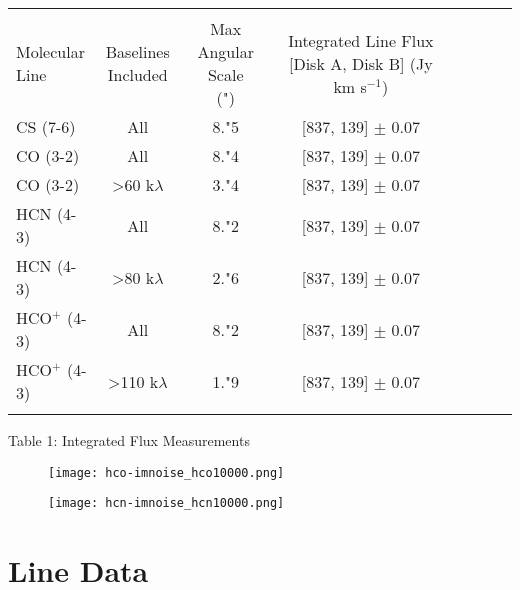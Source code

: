 \begin{tabular}{l*{6}{c}r}
  \hline\hline \\

  \shortstack{Molecular \\ Line} & \shortstack{Baselines \\ Included} & \shortstack{Max Angular Scale \\ (")} & \shortstack{Integrated Line Flux [Disk A, Disk B]\\ (Jy km s$^{-1}$)} \\
  \hline
  CS (7-6)         & All                            & 8."5 & [837, 139] $\pm$ 0.07 \\
  CO (3-2)         & All                            & 8."4 & [837, 139] $\pm$ 0.07 \\
  CO (3-2)         & \textgreater 60 k$\lambda$     & 3."4 & [837, 139] $\pm$ 0.07 \\
  HCN (4-3)        & All                            & 8."2 & [837, 139] $\pm$ 0.07 \\
  HCN (4-3)        & \textgreater 80 k$\lambda$     & 2."6 & [837, 139] $\pm$ 0.07 \\
  HCO$^{+}$ (4-3)  & All                            & 8."2 & [837, 139] $\pm$ 0.07 \\
  HCO$^{+}$ (4-3)  & \textgreater 110 k$\lambda$    & 1."9 & [837, 139] $\pm$ 0.07 \\
  \hline
  \label{baseline_cutting_table}
\end{tabular}
\caption{Table 1: Integrated Flux Measurements}
\bigskip
\bigskip


\begin{figure}
\centering
\begin{minipage}{.48\textwidth}
  \centering
  \texttt{[image: hco-imnoise\_hco10000.png]}
  \label{fig:test1}
\end{minipage}%
\begin{minipage}{.48\textwidth}
  \centering
  \texttt{[image: hcn-imnoise\_hcn10000.png]}
  \label{fig:test2}
\end{minipage}
\end{figure}





\section{Line Data}
\label{section:line_data}

